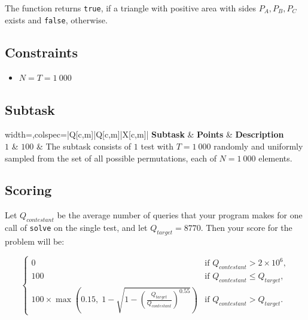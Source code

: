 \documentclass[12pt]{article}
\begin{document}
The function returns \texttt{true}, if a triangle with positive area with sides $P_A,P_B,P_C$ exists and \texttt{false}, otherwise.

\subsection{Constraints}
\vspace{0.1em}
\begin{itemize}
	\item $N = T = 1~000$
\end{itemize}

\subsection{Subtask}
\begin{table}[H]
	\begin{tblr}{width=\linewidth,colspec={|Q[c,m]|Q[c,m]|X[c,m]|}}
		\hline
		\textbf{Subtask} & \textbf{Points} & \textbf{Description}\\
		\hline
		$1$ & $100$ & The subtask consists of $1$ test with $T=1~000$ randomly and uniformly sampled from the set of all possible permutations, each of $N=1~000$ elements.  \\ 
		\hline
	\end{tblr}
	\caption*{The points for a given subtask are obtained only if all the tests for it are successfully passed.}
\end{table}
\FloatBarrier

\newpage
\subsection{Scoring}

Let $Q_{contestant}$ be the average number of queries that your program makes for one call of \texttt{solve} on the single test, and let $Q_{target}=8770$. Then your score for the problem will be:

\[
\begin{cases}
0 & \text{if } Q_{contestant} > 2\times 10^6, \\
100 & \text{if } Q_{contestant} \le Q_{target}, \\
100 \times \max\left(0.15,\; 1-\sqrt{1-\left(\frac{Q_{target}}{Q_{contestant}}\right)^{0.55}}\right) & \text{if } Q_{contestant} > Q_{target}.
\end{cases}
\]
\end{document}
